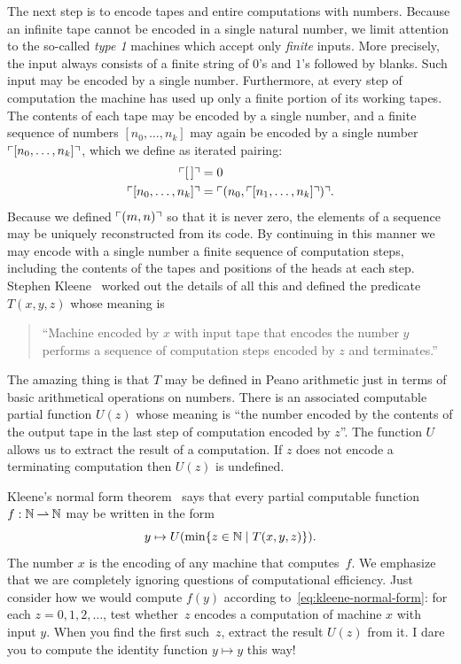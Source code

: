 The next step is to encode tapes and entire computations with numbers.
Because an infinite tape cannot be encoded in a single natural number,
we limit attention to the so-called \emph{type 1} machines which
accept only \emph{finite} inputs. More precisely, the input always
consists of a finite string of $0$'s and $1$'s followed by blanks.
Such input may be encoded by a single number. Furthermore, at every
step of computation the machine has used up only a finite portion of
its working tapes. The contents of each tape may be encoded by a
single number, and a finite sequence of numbers $[n_0, \ldots, n_k]$
may again be encoded by a single number $\ulcorner [n_0, \ldots, n_k] \urcorner$,
which we define as iterated pairing:
%
\begin{align*}
  \ulcorner [\,] \urcorner &= 0 \\
  \ulcorner [n_0, \ldots, n_k] \urcorner &= \ulcorner (n_0, \ulcorner [n_1, \ldots, n_k] \urcorner) \urcorner.
\end{align*}
%
Because we defined $\ulcorner (m,n) \urcorner$ so that it is never zero, the
elements of a sequence may be uniquely reconstructed from its code. By
continuing in this manner we may encode with a single number a finite
sequence of computation steps, including the contents of the tapes
and positions of the heads at each step. Stephen Kleene~\cite{kleene43:_recur_predic_and_quant}
worked out the details of all this and defined the predicate
$T(x,y,z)$ whose meaning is
%
\begin{quote}
  ``Machine encoded by $x$ with input tape that encodes the number $y$
  performs a sequence of computation steps encoded by $z$ and
  terminates.''
\end{quote}
%
The amazing thing is that $T$ may be defined in Peano arithmetic just
in terms of basic arithmetical operations on numbers. There is an
associated computable partial function $U(z)$ whose meaning is ``the
number encoded by the contents of the output tape in the last step of
computation encoded by $z$''. The function $U$ allows us to extract
the result of a computation. If $z$ does not encode a terminating
computation then $U(z)$ is undefined.

Kleene's normal form theorem~\cite{kleene43:_recur_predic_and_quant}
says that every partial computable function $f : \mathbb{N} \mathbin{\rightharpoonup} \mathbb{N}$ may
be written in the form
%
\begin{equation}
  \label{eq:kleene-normal-form}
  y \mapsto U(\min \{z \in \mathbb{N} \mid T(x,y,z)\}).
\end{equation}
%
The number $x$ is the encoding of any machine that computes~$f$. We
emphasize that we are completely ignoring questions of computational
efficiency. Just consider how we would compute $f(y)$ according
to~\eqref{eq:kleene-normal-form}: for each $z = 0, 1, 2, \ldots$, test
whether~$z$ encodes a computation of machine $x$ with input $y$. When
you find the first such~$z$, extract the result $U(z)$ from it. I dare
you to compute the identity function $y \mapsto y$ this way!

